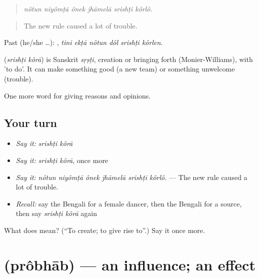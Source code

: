\begin{quote}
\emph{nôtun niyômṭā ônek jhāmelā srishṭi kôrlô.}
\end{quote}

\begin{quote}
The new rule caused a lot of trouble.
\end{quote}

Past (he/she …):      , \emph{tini ekṭā nôtun dôl srishṭi kôrlen}.

\begin{cousinweb}
\textbf{ } (\emph{srishṭi kôrā}) is Sanskrit \emph{sṛṣṭi}, creation or bringing forth (Monier-Williams), with  'to do'. It can make something good (a new team) or something unwelcome (trouble).
\end{cousinweb}

\begin{grammarlens}[title={What you've built}]
One more word for giving reasons and opinions.
\end{grammarlens}

\subsection*{Your turn}
\begin{itemize}
\raggedright
  \item \emph{Say it:} \emph{srishṭi kôrā}
  \item \emph{Say it:} \emph{srishṭi kôrā}, once more
  \item \emph{Say it:} \emph{nôtun niyômṭā ônek jhāmelā srishṭi kôrlô.} — The new rule caused a lot of trouble.
  \item \emph{Recall:} say the Bengali for a female dancer, then the Bengali for a source, then say \emph{srishṭi kôrā} again
\end{itemize}

\begin{tcolorbox}[breakable,colback=teal!4,colframe=teal!35!black,title={Before you move on}]
What does   mean? (\textquotedblleft{}To create; to give rise to\textquotedblright{}.) Say it once more.
\end{tcolorbox}
\section[\texorpdfstring{\bn{প্রভাব} (prôbhāb)}{প্রভাব (prôbhāb)}]{ (prôbhāb) — an influence; an effect}

